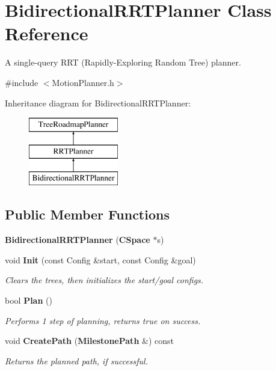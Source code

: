 \section{Bidirectional\+R\+R\+T\+Planner Class Reference}
\label{classBidirectionalRRTPlanner}


A single-\/query R\+RT (Rapidly-\/\+Exploring Random Tree) planner.  




{\ttfamily \#include $<$Motion\+Planner.\+h$>$}

Inheritance diagram for Bidirectional\+R\+R\+T\+Planner\+:\begin{figure}[H]
\begin{center}
\leavevmode
\includegraphics[height=3.000000cm]{classBidirectionalRRTPlanner}
\end{center}
\end{figure}
\subsection*{Public Member Functions}
\begin{DoxyCompactItemize}
\item 
{\bfseries Bidirectional\+R\+R\+T\+Planner} ({\bf C\+Space} $\ast$s)\label{classBidirectionalRRTPlanner_a11d8c99aa3c9e93cae5f03a1f566c654}

\item 
void {\bf Init} (const Config \&start, const Config \&goal)\label{classBidirectionalRRTPlanner_ad87d74d50c4cd273c1ce0ae929412a52}

\begin{DoxyCompactList}\small\item\em Clears the trees, then initializes the start/goal configs. \end{DoxyCompactList}\item 
bool {\bf Plan} ()\label{classBidirectionalRRTPlanner_a78df1be8d25e961f78b39b1e992e07c3}

\begin{DoxyCompactList}\small\item\em Performs 1 step of planning, returns true on success. \end{DoxyCompactList}\item 
void {\bf Create\+Path} ({\bf Milestone\+Path} \&) const \label{classBidirectionalRRTPlanner_a53fbe655860bff1fc9174cedc361c58a}

\begin{DoxyCompactList}\small\item\em Returns the planned path, if successful. \end{DoxyCompactList}\end{DoxyCompactItemize}
